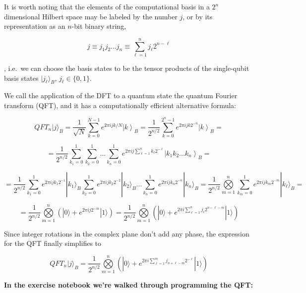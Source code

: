 \documentclass[11pt,dvipsnames]{article}
\begin{document}
It is worth noting that the elements of the computational basis in a
\(2^n\) dimensional Hilbert space may be labeled by the number \(j\), or
by its representation as an \(n\)-bit binary string,

\[
j \equiv j_1 j_2 ... j_n \equiv \sum\limits_{\ell=1}^{n} j_\ell 2^{n-\ell}
\]

, i.e.~we can choose the basis states to be the tensor products of the
single-qubit basis states \(|j_\ell\rangle_B\), \(j_\ell\in\{0,1\}\).

We call the application of the DFT to a quantum state the quantum
Fourier transform (QFT), and it has a computationally efficient
alternative formula:

\[
QFT_n |j\rangle_{B} = \frac{1}{\sqrt{N}}\sum^{N-1}_{k=0} e^{2\pi i j k /N}\left|k\right\rangle_{B} = 
\frac{1}{2^{n/2}}\sum^{2^n-1}_{k=0} e^{2\pi i j k 2^{-n}}\left|k\right\rangle_{B} = 
\]

\[
= \frac{1}{2^{n/2}}\sum^{1}_{k_1=0}\sum^{1}_{k_2=0}...\sum^{1}_{k_n=0}
e^{2\pi i j \sum\limits_{\ell=1}^{n} k_\ell 2^{-\ell}}\left|k_1 k_2 ... k_n\right\rangle_{B} =
\]

\[
= \frac{1}{2^{n/2}}\sum^{1}_{k_1=0}e^{2\pi i j k_1 2^{-1}}|k_1\rangle_B
\sum^{1}_{k_2=0}e^{2\pi i j k_2 2^{-2}}|k_2\rangle_B... 
\sum^{1}_{k_n=0}e^{2\pi i j k_n 2^{-n}}|k_n\rangle_B = 
\frac{1}{2^{n/2}} \bigotimes\limits_{m=1}^{n}\sum\limits_{k_m=0}^1 e^{2\pi i j k_m 2^{-m}}|k_\ell\rangle_B = 
\]

\[
= \frac{1}{2^{n/2}} \bigotimes\limits_{m=1}^{n}\left(|0\rangle + e^{2\pi i j 2^{-m}}|1\rangle \right) = 
\frac{1}{2^{n/2}} \bigotimes\limits_{m=1}^{n}\left(|0\rangle + e^{2\pi i \sum\limits_{\ell=1}^n j_\ell 2^{n-\ell-m}}|1\rangle \right) 
\]

Since integer rotations in the complex plane don't add any phase, the
expression for the QFT finally simplifies to

\[
QFT_n |j\rangle_{B} = \frac{1}{2^{n/2}} \bigotimes\limits_{m=1}^{n}\left(|0\rangle + e^{2\pi i \sum\limits_{\ell=1}^{m} j_{n+\ell-m} 2^{-\ell}}|1\rangle \right) 
\]

    \textbf{In the exercise notebook we're walked through programming the
QFT:}
\end{document}
